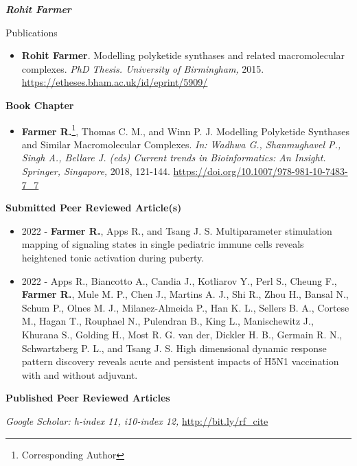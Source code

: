 \documentclass[10pt]{article}
\begin{document}
\begin{cv}{\huge \it \bfseries Rohit Farmer}
\vskip3pt
\begin{cvlist}{Publications}
\item {\begin{itemize}\item{\bf Rohit Farmer}. Modelling polyketide synthases and related macromolecular complexes. \emph{PhD Thesis. University of Birmingham,} 2015. \url{https://etheses.bham.ac.uk/id/eprint/5909/} \end{itemize}}

\vskip3pt
\item {\textbf{Book Chapter}}
\item {\begin{itemize}\item{\bf Farmer R.}\footnote{Corresponding Author}, Thomas C. M., and Winn P. J. Modelling Polyketide Synthases and Similar Macromolecular Complexes. \emph{In: Wadhwa G., Shanmughavel P., Singh A., Bellare J. (eds) Current trends in Bioinformatics: An Insight. Springer, Singapore,} 2018, 121-144. \url{https://doi.org/10.1007/978-981-10-7483-7_7} \end{itemize}}

\vskip3pt
\item {\textbf{Submitted Peer Reviewed Article(s)}}
\item {\begin{itemize}
	\item  2022 - \textbf{Farmer R.}, Apps R., and Tsang J. S. Multiparameter stimulation mapping of signaling states in single pediatric immune cells reveals heightened tonic activation during puberty.

	\item  2022 -  Apps R., Biancotto A., Candia J., Kotliarov Y., Perl S., Cheung F., \textbf{Farmer R.}, Mule M. P., Chen J., Martins A. J., Shi R., Zhou H., Bansal N., Schum P., Olnes M. J., Milanez-Almeida P., Han K. L., Sellers B. A., Cortese M., Hagan T., Rouphael N., Pulendran B., King L., Manischewitz J., Khurana S., Golding H., Most R. G. van der, Dickler H. B., Germain R. N., Schwartzberg P. L., and Tsang J. S. High dimensional dynamic response pattern discovery reveals acute and persistent impacts of H5N1 vaccination with and without adjuvant. 
\end{itemize}}

\vskip3pt
\item {\bf Published Peer Reviewed Articles}
\item {\textit{Google Scholar: h-index 11, i10-index 12,} \url{http://bit.ly/rf_cite}}
\vskip3pt
\item{ }


\end{cvlist}
\end{cv}
\end{document}
